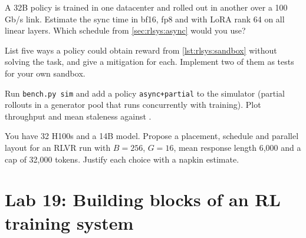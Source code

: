 \begin{exercise}
A 32B policy is trained in one datacenter and rolled out in another over a 100\,Gb/s link.
Estimate the sync time in bf16, fp8 and with LoRA rank 64 on all linear layers. Which
schedule from \cref{sec:rlsys:async} would you use?
\end{exercise}

\begin{exercise}
List five ways a policy could obtain reward from \cref{lst:rlsys:sandbox} without solving the
task, and give a mitigation for each. Implement two of them as tests for your own sandbox.
\end{exercise}

\begin{exercise}[Measurement]
Run \texttt{bench.py sim} and add a policy \texttt{async+partial} to the simulator (partial
rollouts in a generator pool that runs concurrently with training). Plot throughput and
mean staleness against .
\end{exercise}

\begin{exercise}[Design]
You have 32 H100s and a 14B model. Propose a placement, schedule and parallel layout for an
RLVR run with $B=256$, $G=16$, mean response length 6{,}000 and a cap of 32{,}000 tokens.
Justify each choice with a napkin estimate.
\end{exercise}

\section{Lab 19: Building blocks of an RL training system}\label{sec:rlsys:lab}

